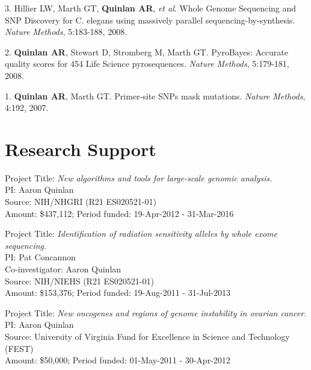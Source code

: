 \documentclass[margin,line]{cv}
\begin{document}
\begin{resume}
\begin{list}{*}{}
    \item[3.] Hillier LW, Marth GT, \textbf{Quinlan AR}, \textit{et al}. 
    Whole Genome Sequencing and SNP Discovery for C. elegans using massively parallel sequencing-by-synthesis. 
    \textit{Nature Methods}, 5:183-188, 2008.
    
    \item[2.] \textbf{Quinlan AR}, Stewart D, Stromberg M, Marth GT. 
    PyroBayes: Accurate quality scores for 454 Life Science pyrosequences.
    \textit{Nature Methods}, 5:179-181, 2008.
    
    \item[1.] \textbf{Quinlan AR}, Marth GT. 
    Primer-site SNPs mask mutations. 
    \textit{Nature Methods}, 4:192, 2007.

    \end{list}
    

    \section{\mysidestyle Research Support}

    Project Title: \textit{New algorithms and tools for large-scale genomic analysis.} \\
    PI: Aaron Quinlan \\
    Source: NIH/NHGRI (R21 ES020521-01) \\
    Amount: \$437,112; Period funded: 19-Apr-2012 - 31-Mar-2016
    
    Project Title: \textit{Identification of radiation sensitivity alleles by whole exome sequencing.} \\
    PI: Pat Concannon \\
    Co-investigator: Aaron Quinlan \\
    Source: NIH/NIEHS (R21 ES020521-01) \\
    Amount: \$153,376; Period funded: 19-Aug-2011 - 31-Jul-2013
    
    \vspace{-2mm}
    Project Title: \textit{New oncogenes and regions of genome instability in ovarian cancer.} \\
    PI: Aaron Quinlan \\
    Source: University of Virginia Fund for Excellence in Science and Technology (FEST) \\
    Amount: \$50,000; Period funded: 01-May-2011 - 30-Apr-2012
    

\end{resume}
\end{document}
